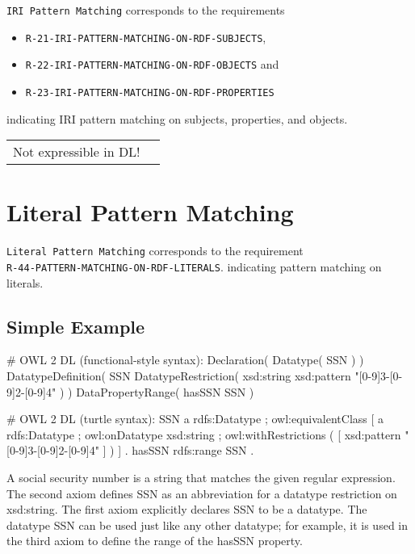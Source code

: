 \documentclass{llncs}
\newcommand{\ms}[1]{\texttt{#1}}
\newenvironment{DL}{
\vspace{0cm}
	\begin{center}
  \begin{tabular}{r l}

}{
  \end{tabular}
	\end{center}
}
\begin{document}
\ms{IRI Pattern Matching} corresponds to the requirements
\begin{itemize}
	\item \ms{R-21-IRI-PATTERN-MATCHING-ON-RDF-SUBJECTS},
	\item \ms{R-22-IRI-PATTERN-MATCHING-ON-RDF-OBJECTS} and
	\item \ms{R-23-IRI-PATTERN-MATCHING-ON-RDF-PROPERTIES} 
\end{itemize}
indicating IRI pattern matching on subjects, properties, and objects.

\begin{DL}
Not expressible in DL!
\end{DL}

\section{Literal Pattern Matching}

\ms{Literal Pattern Matching} corresponds to the requirement \\
\ms{R-44-PATTERN-MATCHING-ON-RDF-LITERALS}.
indicating pattern matching on literals.

\subsection{Simple Example}

\begin{ex}
# OWL 2 DL (functional-style syntax):
Declaration( Datatype( SSN ) ) 
DatatypeDefinition( 
    SSN
    DatatypeRestriction( xsd:string xsd:pattern "[0-9]{3}-[0-9]{2}-[0-9]{4}" ) )     
DataPropertyRange( hasSSN SSN ) 
\end{ex}

\begin{ex}
# OWL 2 DL (turtle syntax):
SSN 
    a rdfs:Datatype ;
    owl:equivalentClass [
        a rdfs:Datatype ;
        owl:onDatatype xsd:string ;
        owl:withRestrictions ( 
            [ xsd:pattern "[0-9]{3}-[0-9]{2}-[0-9]{4}" ] ) ] .
hasSSN rdfs:range SSN .
\end{ex}

A social security number is a string that matches the given regular expression. 
The second axiom defines SSN as an abbreviation for a datatype restriction on xsd:string. 
The first axiom explicitly declares SSN to be a datatype. 
The datatype SSN can be used just like any other datatype; 
for example, it is used in the third axiom to define the range of the hasSSN property. 
\end{document}
